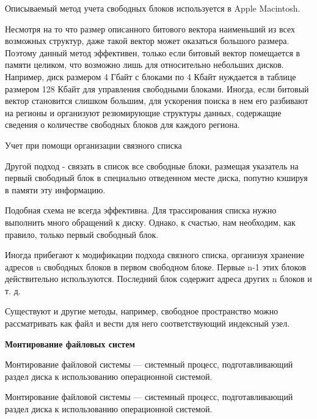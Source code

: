 Описываемый метод учета свободных блоков используется в Apple Macintosh.

Несмотря на то что размер описанного битового вектора наименьший из всех возможных структур, даже такой вектор может оказаться большого размера. Поэтому данный метод эффективен, только если битовый вектор помещается в памяти целиком, что возможно лишь для относительно небольших дисков. Например, диск размером 4 Гбайт с блоками по 4 Кбайт нуждается в таблице размером 128 Кбайт для управления свободными блоками. Иногда, если битовый вектор становится слишком большим, для ускорения поиска в нем его разбивают на регионы и организуют резюмирующие структуры данных, содержащие сведения о количестве свободных блоков для каждого региона.


\begin{way}
  \begin{center}
    Учет при помощи организации связного списка
  \end{center}
  Другой подход - связать в список все свободные блоки, размещая указатель на первый свободный блок в специально отведенном месте диска, попутно кэшируя в памяти эту информацию.
   \end{way}

   Подобная схема не всегда эффективна. Для трассирования списка нужно выполнить много обращений к диску. Однако, к счастью, нам необходим, как правило, только первый свободный блок.

   Иногда прибегают к модификации подхода связного списка, организуя хранение адресов n свободных блоков в первом свободном блоке. Первые n-1 этих блоков действительно используются. Последний блок содержит адреса других n блоков и т. д.

\begin{note}
Существуют и другие методы, например, свободное пространство можно рассматривать как файл и вести для него соответствующий индексный узел.
\end{note}

\begin{center}{\bfseries Монтирование файловых систем}
\end{center}

\begin{opr}
  Монтирование файловой системы — системный процесс, подготавливающий раздел диска к использованию операционной системой.
\end{opr}

\begin{opr}
  Монтирование файловой системы — системный процесс, подготавливающий раздел диска к использованию операционной системой.
\end{opr}

